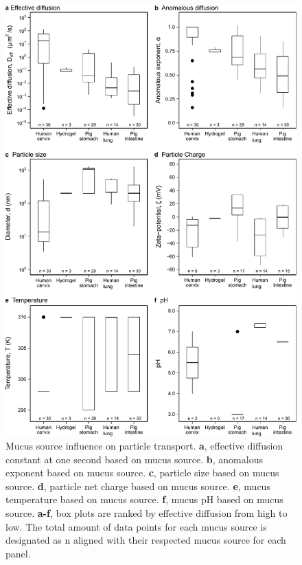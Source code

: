 \documentclass[a4paper]{article}
\begin{document}
\begin{figure}[H]
    \centering
    \includegraphics[width = 12 cm]{Figure_Mucus_Source.pdf}
    \caption{Mucus source influence on particle transport.  \textbf{a}, effective diffusion constant at one second based on mucus source. \textbf{b}, anomalous exponent based on mucus source.  \textbf{c},  particle size based on mucus source. \textbf{d}, particle net charge based on mucus source. \textbf{e},  mucus temperature based on mucus source. \textbf{f},  mucus pH based on mucus source. \textbf{a-f}, box plots are ranked by effective diffusion from high to low. The total amount of data points for each mucus source is designated as n aligned with their respected mucus source for each panel.
    }
    \label{fig:MucSourBOX}
\end{figure}

\clearpage
\end{document}
